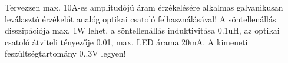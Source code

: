 \begin{example}

Tervezzen max. 10A-es amplitudójú áram érzékelésére alkalmas galvanikusan leválasztó érzékelőt analóg optikai csatoló felhasználásával! A söntellenállás disszipációja max. 1W lehet, a söntellenállás induktivitása 0.1uH, az optikai csatoló átviteli tényezője 0.01, max. LED árama 20mA. A kimeneti feszültségtartomány 0..3V legyen!

\tcbline
\vspace{1mm}

\solution

\end{example}